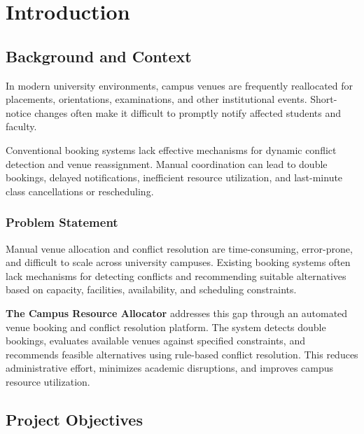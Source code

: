 \documentclass[12pt, a4paper, oneside]{report}
\begin{document}
\chapter{Introduction}

\section{Background and Context}
In modern university environments, campus venues are frequently reallocated for placements, orientations, examinations, and other institutional events. Short-notice changes often make it difficult to promptly notify affected students and faculty.

Conventional booking systems lack effective mechanisms for dynamic conflict detection and venue reassignment. Manual coordination can lead to double bookings, delayed notifications, inefficient resource utilization, and last-minute class cancellations or rescheduling.


\subsection{Problem Statement}
Manual venue allocation and conflict resolution are time-consuming, error-prone, and difficult to scale across university campuses. Existing booking systems often lack mechanisms for detecting conflicts and recommending suitable alternatives based on capacity, facilities, availability, and scheduling constraints.

\vspace{\baselineskip}
\textbf{The Campus Resource Allocator} addresses this gap through an automated venue booking and conflict resolution platform. The system detects double bookings, evaluates available venues against specified constraints, and recommends feasible alternatives using rule-based conflict resolution. This reduces administrative effort, minimizes academic disruptions, and improves campus resource utilization.

\section{Project Objectives}
\end{document}
